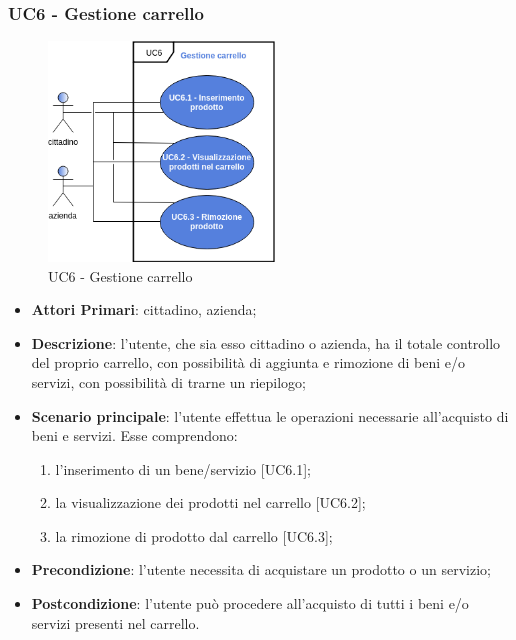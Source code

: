 \subsubsection{UC6 - Gestione carrello}
 \begin{figure}[h]
	\includegraphics[width=6cm]{res/images/UC6GestioneCarrello.png}
	\centering
	\caption{UC6 - Gestione carrello}
\end{figure}
\begin{itemize}
	\item \textbf{Attori Primari}: cittadino, azienda\glo;
	\item \textbf{Descrizione}: l'utente, che sia esso cittadino o azienda, ha il totale controllo del proprio carrello, con possibilità di aggiunta e rimozione di beni e/o servizi, con possibilità di trarne un riepilogo;
	\item \textbf{Scenario principale}: l'utente effettua le operazioni necessarie all'acquisto di beni e servizi. Esse comprendono:
	\begin{enumerate}[label=\alph*.]
		\item l'inserimento di un bene/servizio [UC6.1];
		\item la visualizzazione dei prodotti nel carrello [UC6.2];
		\item la rimozione di prodotto dal carrello [UC6.3];
	\end{enumerate}
	\item \textbf{Precondizione}: l'utente necessita di acquistare un prodotto o un servizio;
	\item \textbf{Postcondizione}: l'utente può procedere all'acquisto di tutti i beni e/o servizi presenti nel carrello.
\end{itemize} 
